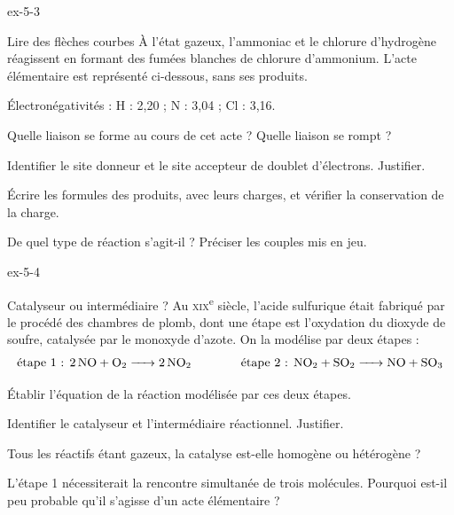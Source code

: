 \begin{blocLivre}{ex-5-3}
\begin{exercice}[1]{Lire des flèches courbes}
À l'état gazeux, l'ammoniac et le chlorure d'hydrogène réagissent en formant des fumées blanches de chlorure
d'ammonium. L'acte élémentaire est représenté ci-dessous, sans ses produits.
\begin{donnees}
Électronégativités : H : 2,20 ; N : 3,04 ; Cl : 3,16.
\end{donnees}
\begin{questions}
\item Quelle liaison se forme au cours de cet acte ? Quelle liaison se rompt ?
\item Identifier le site donneur et le site accepteur de doublet d'électrons. Justifier.
\item Écrire les formules des produits, avec leurs charges, et vérifier la conservation de la charge.
\item De quel type de réaction s'agit-il ? Préciser les couples mis en jeu.
\end{questions}
\end{exercice}
\end{blocLivre}
\begin{blocLivre}{ex-5-4}
\begin{exercice}[1]{Catalyseur ou intermédiaire ?}
Au \textsc{xix}\textsuperscript{e} siècle, l'acide sulfurique était fabriqué par le procédé des chambres de plomb, dont
une étape est l'oxydation du dioxyde de soufre, catalysée par le monoxyde d'azote. On la modélise par deux étapes :
\[\text{étape 1 : }\ce{2 NO + O2 -> 2 NO2}\qquad\qquad\text{étape 2 : }\ce{NO2 + SO2 -> NO + SO3}\]
\begin{questions}
\item Établir l'équation de la réaction modélisée par ces deux étapes.
\item Identifier le catalyseur et l'intermédiaire réactionnel. Justifier.
\item Tous les réactifs étant gazeux, la catalyse est-elle homogène ou hétérogène ?
\item L'étape 1 nécessiterait la rencontre simultanée de trois molécules. Pourquoi est-il peu probable qu'il s'agisse
d'un acte élémentaire ?
\end{questions}
\end{exercice}
\end{blocLivre}
